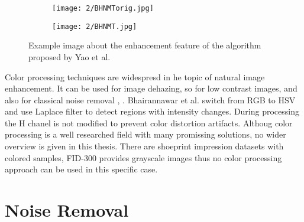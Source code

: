 \documentclass[draft,final]{vutinfth} %
\begin{document}
\begin{figure}[h]
  \centering
  \begin{subfigure}[b]{0.4\columnwidth}
    \centering
    \texttt{[image: 2/BHNMTorig.jpg]}
    \label{fig:rw:BHNMTin}
  \end{subfigure}
  \begin{subfigure}[b]{0.4\columnwidth}
    \centering
    \texttt{[image: 2/BHNMT.jpg]}
    \label{fig:rw:BHNMTout}
  \end{subfigure}
  \caption{Example image  \cite{yao2016image} about the enhancement feature of the algorithm proposed by Yao et al. \cite{yao2016image} }
  \label{fig:rw:BHNMT} %
\end{figure}

\par
Color processing techniques are widespresd in he topic of natural image enhancement.
It can be used for image dehazing, so for low contrast images, \cite{singh2018dehazing} and also for classical noise removal \cite{ren2018joint}, \cite{zhang2016simultaneous}. 
Bhairannawar et al. \cite{bhairannawar2017color} switch from RGB to HSV and use Laplace filter to detect regions with intensity changes. 
During processing the H chanel is not modified to prevent color distortion artifacts.
Althoug color processing is a well researched field with many promissing solutions, no wider overview is given in this thesis.
There are shoeprint impression datasets with colored samples, FID-300 provides grayscale images thus no color processing approach can be used in this specific case. 

\section{Noise Removal}
\end{document}
